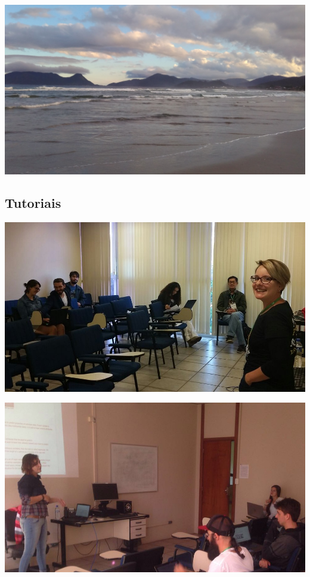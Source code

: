 \documentclass[12pt]{article}
\begin{document}
\noindent  %
\includegraphics[width=\textwidth]{venue-beach.jpg}

\subsection*{Tutoriais}

\noindent  %
\includegraphics[width=\textwidth]{tutorial-latex.jpg}

\noindent  %
\includegraphics[width=\textwidth]{tutorial-pyopencl.jpg}
\end{document}
